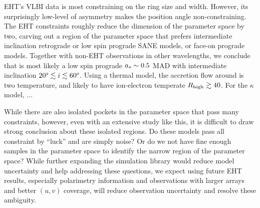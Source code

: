 EHT's VLBI data is most constraining on the ring size and width.
However, its surprisingly low-level of asymmetry makes the position
angle non-constraining.
The EHT constraints roughly reduce the dimension of the parameter
space by two, carving out a region of the parameter space that prefers
intermediate inclination retrograde or low spin prograde SANE models,
or face-on prograde models.
Together with non-EHT observations in other wavelengths, we conclude
that \sgra is most likely a low spin prograde $a_* \sim 0.5$ MAD with
intermediate inclination $20\degree \lesssim i \lesssim 60\degree$.
Using a thermal model, the accretion flow around \sgra is two
temperature, and likely to have ion-electron temperate $R_\mathrm{high} \gtrsim
40$.
For the $\kappa$ model, ...

While there are also isolated pockets in the parameter space that pass
many constraints, however, even with an extensive study like this, it
is difficult to draw strong conclusion about these isolated regions.
Do these models pass all constraint by ``luck'' and are simply noise?
Or do we not have fine enough samples in the parameter space to
identify the narrow region of the parameter space?
While further expanding the simulation library would reduce model
uncertainty and help addressing these questions, we expect using
future EHT results, especially polarimetry information and
observations with larger arrays and better $(u, v)$ coverage, will
reduce observation uncertainty and resolve these ambiguity.

